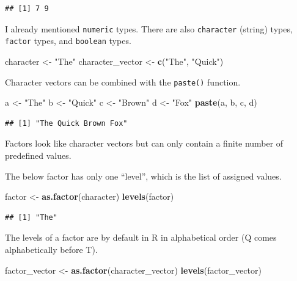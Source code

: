 \documentclass[openany]{book}
\newenvironment{Shaded}{\begin{snugshade}}{\end{snugshade}}
\newcommand{\KeywordTok}[1]{\textcolor[rgb]{0.13,0.29,0.53}{\textbf{#1}}}
\newcommand{\NormalTok}[1]{#1}
\newcommand{\StringTok}[1]{\textcolor[rgb]{0.31,0.60,0.02}{#1}}
\begin{document}
\begin{verbatim}
## [1] 7 9
\end{verbatim}

I already mentioned \texttt{numeric} types. There are also \texttt{character} (string) types,
\texttt{factor} types, and \texttt{boolean} types.

\begin{Shaded}
\begin{Highlighting}[]
\NormalTok{character <-}\StringTok{ "The"}
\NormalTok{character_vector <-}\StringTok{ }\KeywordTok{c}\NormalTok{(}\StringTok{"The"}\NormalTok{, }\StringTok{"Quick"}\NormalTok{)}
\end{Highlighting}
\end{Shaded}

Character vectors can be combined with the \texttt{paste()} function.

\begin{Shaded}
\begin{Highlighting}[]
\NormalTok{a <-}\StringTok{ "The"}
\NormalTok{b <-}\StringTok{ "Quick"}
\NormalTok{c <-}\StringTok{ "Brown"}
\NormalTok{d <-}\StringTok{ "Fox"}
\KeywordTok{paste}\NormalTok{(a, b, c, d)}
\end{Highlighting}
\end{Shaded}

\begin{verbatim}
## [1] "The Quick Brown Fox"
\end{verbatim}

Factors look like character vectors but can only contain a finite number of predefined
values.

The below factor has only one ``level'', which is the list of assigned values.

\begin{Shaded}
\begin{Highlighting}[]
\NormalTok{factor <-}\StringTok{ }\KeywordTok{as.factor}\NormalTok{(character)}
\KeywordTok{levels}\NormalTok{(factor)}
\end{Highlighting}
\end{Shaded}

\begin{verbatim}
## [1] "The"
\end{verbatim}

The levels of a factor are by default in R in alphabetical order (Q comes alphabetically
before T).

\begin{Shaded}
\begin{Highlighting}[]
\NormalTok{factor_vector <-}\StringTok{ }\KeywordTok{as.factor}\NormalTok{(character_vector)}
\KeywordTok{levels}\NormalTok{(factor_vector)}
\end{Highlighting}
\end{Shaded}
\end{document}

